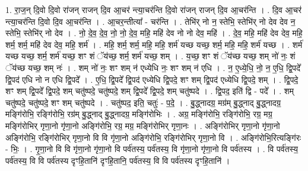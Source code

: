\documentclass[17pt]{extarticle}
\begin{document}
1. रा॒ज॒न् दि॒वो दि॒वो रा॑जन् राजन् दि॒व आ॒चर॑ न्त्या॒चर॑न्ति दि॒वो रा॑जन् राजन् दि॒व आ॒चर॑न्ति । . दि॒व आ॒चर॑ न्त्या॒चर॑न्ति दि॒वो दि॒व आ॒चर॑न्ति । . आ॒चर॒न्तीत्या᳚ - चर॑न्ति । . तेभि॑र् नो न॒ स्तेभि॒ स्तेभि॑र् नो देव देव न॒ स्तेभि॒ स्तेभि॑र् नो देव । . नो॒ दे॒व॒ दे॒व॒ नो॒ नो॒ दे॒व॒ महि॒ महि॑ देव नो नो देव॒ महि॑ । . दे॒व॒ महि॒ महि॑ देव देव॒ महि॒ शर्म॒ शर्म॒ महि॑ देव देव॒ महि॒ शर्म॑ । . महि॒ शर्म॒ शर्म॒ महि॒ महि॒ शर्म॑ यच्छ यच्छ॒ शर्म॒ महि॒ महि॒ शर्म॑ यच्छ । . शर्म॑ यच्छ यच्छ॒ शर्म॒ शर्म॑ यच्छ॒ शꣳ शं ॅय॑च्छ॒ शर्म॒ शर्म॑ यच्छ॒ शम् । . य॒च्छ॒ शꣳ शं ॅय॑च्छ यच्छ॒ शम् नो॑ नः॒ शं ॅय॑च्छ यच्छ॒ शम् नः॑ । . शम् नो॑ नः॒ शꣳ शम् न॑ एध्येधि नः॒ शꣳ शम् न॑ एधि । . न॒ ए॒ध्ये॒धि॒ नो॒ न॒ ए॒धि॒ द्वि॒पदे᳚ द्वि॒पद॑ एधि नो न एधि द्वि॒पदे᳚ । . ए॒धि॒ द्वि॒पदे᳚ द्वि॒पद॑ एध्येधि द्वि॒पदे॒ शꣳ शम् द्वि॒पद॑ एध्येधि द्वि॒पदे॒ शम् । . द्वि॒पदे॒ शꣳ शम् द्वि॒पदे᳚ द्वि॒पदे॒ शम् चतु॑ष्पदे॒ चतु॑ष्पदे॒ शम् द्वि॒पदे᳚ द्वि॒पदे॒ शम् चतु॑ष्पदे । . द्वि॒पद॒ इति॑ द्वि - पदे᳚ । . शम् चतु॑ष्पदे॒ चतु॑ष्पदे॒ शꣳ शम् चतु॑ष्पदे । . चतु॑ष्पद॒ इति॒ चतुः॑ - प॒दे॒ । . बु॒द्ध्नादग्र॒ मग्र॑म् बु॒द्ध्नाद् बु॒द्ध्नादग्र॒ मङ्गि॑रोभि॒ रङ्गि॑रोभि॒ रग्र॑म् बु॒द्ध्नाद् बु॒द्ध्नादग्र॒ मङ्गि॑रोभिः । . अग्र॒ मङ्गि॑रोभि॒ रङ्गि॑रोभि॒ रग्र॒ मग्र॒ मङ्गि॑रोभिर् गृणा॒नो गृ॑णा॒नो अङ्गि॑रोभि॒ रग्र॒ मग्र॒ मङ्गि॑रोभिर् गृणा॒नः । . अङ्गि॑रोभिर् गृणा॒नो गृ॑णा॒नो अङ्गि॑रोभि॒ रङ्गि॑रोभिर् गृणा॒नो वि वि गृ॑णा॒नो अङ्गि॑रोभि॒ रङ्गि॑रोभिर् गृणा॒नो वि । . अङ्गि॑रोभि॒रित्यङ्गि॑रः - भिः॒ । . गृ॒णा॒नो वि वि गृ॑णा॒नो गृ॑णा॒नो वि पर्व॑तस्य॒ पर्व॑तस्य॒ वि गृ॑णा॒नो गृ॑णा॒नो वि पर्व॑तस्य । . वि पर्व॑तस्य॒ पर्व॑तस्य॒ वि वि पर्व॑तस्य दृꣳहि॒तानि॑ दृꣳहि॒तानि॒ पर्व॑तस्य॒ वि वि पर्व॑तस्य दृꣳहि॒तानि॑ । \newline
\end{document}
